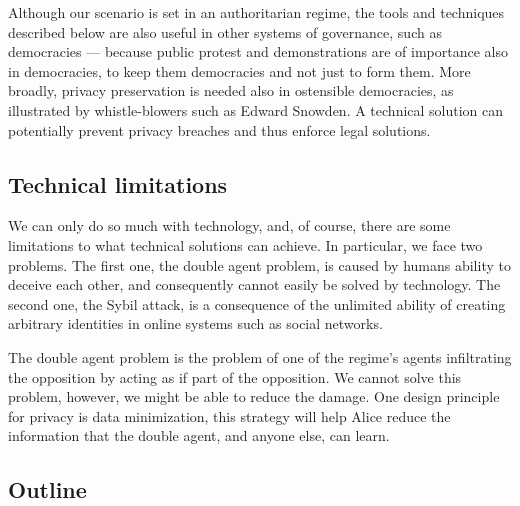 Although our scenario is set in an authoritarian regime, the tools and
techniques described below are also useful in other systems of
governance, such as democracies --- because public protest and
demonstrations are of importance also in democracies, to keep them
democracies and not just to form them. More broadly, privacy
preservation is needed also in ostensible democracies, as illustrated
by whistle-blowers such as Edward Snowden. A technical solution can
potentially prevent privacy breaches and thus enforce legal solutions.



\subsection{Technical limitations}

We can only do so much with technology, and, of course, there are some 
limitations to what technical solutions can achieve.
In particular, we face two problems.
The first one, the double agent problem, is caused by humans ability to deceive 
each other, and consequently cannot easily be solved by technology.
The second one, the Sybil attack, is a consequence of the unlimited ability of creating 
arbitrary identities in online systems such as social networks.

\label{DoubleAgentProblem}
The double agent problem is the problem of one of the regime's agents 
infiltrating the opposition by acting as if part of the opposition.
We cannot solve this problem, however, we might be able to reduce the damage.
One design principle for privacy is data minimization, this strategy will help 
Alice reduce the information that the double agent, and anyone else, can learn.

\label{SybilAttacks}


\subsection{Outline}
\label{Outline}


